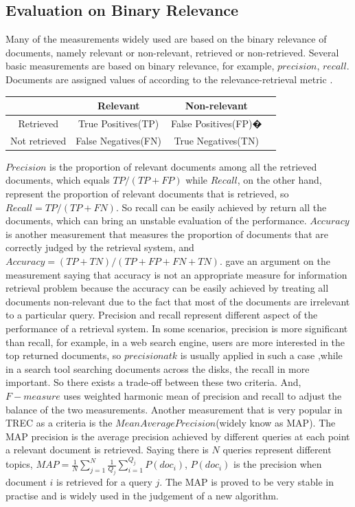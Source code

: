 \subsection{Evaluation on Binary Relevance}
Many of the measurements widely used are based on the binary relevance of documents, namely relevant or non-relevant, retrieved or non-retrieved. Several basic measurements are based on binary relevance, for example, $precision$, $recall$. Documents are assigned values of according to the relevance-retrieval metric .  
\begin{center}
\begin{tabular}{  | c | c | c | r | }
\hline
{}
 &  {Relevant}
 &{Non-relevant} \\
\hline
Retrieved  &True Positives(TP) & False Positives(FP)�\\
\hline
Not retrieved & False Negatives(FN)& True Negatives(TN)\\
\hline
\end{tabular}
\end{center}
$Precision$ is the proportion of relevant documents among all the retrieved documents, which equals $TP/(TP+FP)$ while $Recall$, on the other hand, represent the proportion of relevant documents that is retrieved, so $Recall=TP/(TP+FN)$. So recall can be easily achieved by return all the documents, which can bring an unstable evaluation of the performance. $Accuracy$ is another measurement that measures the proportion of documents that are correctly judged by the retrieval system, and $Accuracy=(TP+TN)/(TP+FP+FN+TN)$. \cite{Manning2008} gave an argument on the measurement saying that accuracy is not an appropriate measure for information retrieval problem because the accuracy can be easily achieved by treating all documents non-relevant due to the fact that most of the documents are irrelevant to a particular query. Precision and recall represent different aspect of the performance of a retrieval system. In some scenarios, precision is more significant than recall, for example, in a web search engine, users are more interested in the top returned documents, so $precision at k$ is usually applied in such a case ,while in a search tool searching documents across the disks, the recall in more important. So there exists a trade-off between these two criteria. And, $F-measure$ uses weighted harmonic mean of precision and recall to adjust the balance of the two measurements. Another measurement that is very popular in TREC as a criteria is the $Mean Average Precision$(widely know as MAP). The MAP precision is the average precision achieved by different queries at each point a relevant document is retrieved. Saying there is $N$ queries represent different topics, $MAP=\frac{1}{N}\sum\limits_{j=1}^N{\frac{1}{Q_j}\sum\limits_{i=1}^{Q_j}P(doc_i)}$, $P(doc_i)$ is the precision when document $i$ is retrieved for a query $j$. The MAP is proved to be very stable in practise and is widely used in the judgement of a new algorithm.

